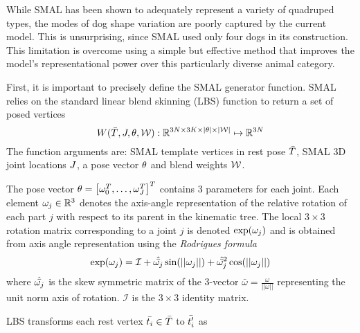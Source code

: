 While SMAL has been shown to adequately represent a variety of quadruped types, the modes of dog shape variation are poorly captured by the current model. This is unsurprising, since SMAL used only four dogs in its construction. This limitation is overcome using a simple but effective method that improves the model's representational power over this particularly diverse animal category. 

First, it is important to precisely define the SMAL generator function. SMAL relies on the standard linear blend skinning (LBS) function to return a set of posed vertices
\begin{equation}
    W(\bar{T},J,\theta,\mathcal{W}) : \mathbb{R}^{3N \times 3K \times |\theta| \times |\mathcal{W}|} \mapsto {\mathbb{R}^{3N}}
\end{equation}
The function arguments are: SMAL template vertices in rest pose $\bar{T}$, SMAL 3D joint locations $J$, a pose vector $\theta$ and blend weights $\mathcal{W}$.

The pose vector $\theta = \left[\omega_{0}^{T},\dots,\omega_{J}^{T}\right]^{T}$ contains 3 parameters for each joint. Each element $\omega_{j} \in {\mathbb{R}^{3}}$ denotes the axis-angle representation of the relative rotation of each part $j$ with respect to its parent in the kinematic tree. The local $3 \times 3$ rotation matrix corresponding to a joint $j$ is denoted $\exp(\omega_{j})$ and is obtained from axis angle representation using the \emph{Rodrigues formula}
\begin{equation}
    \exp(\omega_{j}) = \mathcal{I} + \hat{\bar{\omega_{j}}}\sin(||\omega_{j}||) + \hat{\bar{\omega_{j}}}^{2}\cos(||\omega_{j}||)
\end{equation}
where $\hat{\bar{\omega_{j}}}$ is the skew symmetric matrix of the 3-vector $\bar{\omega} = \frac{\omega}{||\omega||}$ representing the unit norm axis of rotation. $\mathcal{I}$ is the $3 \times 3$ identity matrix.

LBS transforms each rest vertex $\bar{t_{i}} \in \bar{T}$ to $\bar{t'_{i}}$ as

